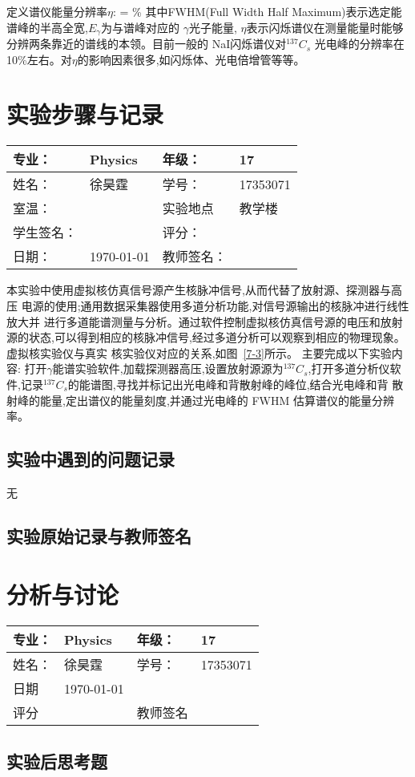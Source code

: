 \documentclass[11pt,a4paper]{ctexart}
\begin{document}
定义谱仪能量分辨率$\eta$:
\beq
\eta = \%
\eeq
其中FWHM(Full Width Half Maximum)表示选定能谱峰的半高全宽,$E_\gamma$为与谱峰对应的
$\gamma$光子能量, $\eta$表示闪烁谱仪在测量能量时能够分辨两条靠近的谱线的本领。目前一般的 NaI闪烁谱仪对$^{137}C_s$ 光电峰的分辨率在 10\%左右。对$\eta$的影响因素很多,如闪烁体、光电倍增管等等。
\newpage
\section{实验步骤与记录}
\begin{tabular}{|p{8em}|p{8em}|p{8em}|p{8em}|}
	\hline 
	专业：     &Physics       &年级：      & 17     \\
	\hline
	姓名：& 徐昊霆 &学号：&17353071  \\
	\hline
	室温：&                    &实验地点 & 教学楼 \\
	\hline	
	学生签名： & & 评分： & \\
	\hline
	日期： & \today & 教师签名：&  \\
	\hline
\end{tabular}

本实验中使用虚拟核仿真信号源产生核脉冲信号,从而代替了放射源、探测器与高压
电源的使用;通用数据采集器使用多道分析功能,对信号源输出的核脉冲进行线性放大并
进行多道能谱测量与分析。通过软件控制虚拟核仿真信号源的电压和放射源的状态,可以得到相应的核脉冲信号,经过多道分析可以观察到相应的物理现象。虚拟核实验仪与真实
核实验仪对应的关系,如图~\ref{7-3}所示。
主要完成以下实验内容:
打开$\gamma$能谱实验软件,加载探测器高压,设置放射源源为$^{137}C_s$,打开多道分析仪软
件,记录$^{137}C_s$的能谱图,寻找并标记出光电峰和背散射峰的峰位,结合光电峰和背
散射峰的能量,定出谱仪的能量刻度,并通过光电峰的 FWHM 估算谱仪的能量分辨
率。

    
\subsection{实验中遇到的问题记录}
无
\subsection{实验原始记录与教师签名}

\newpage
\section{分析与讨论}
\begin{tabular}{|p{7em}|p{7em}|p{7em}|p{7em}|}
	\hline 
	专业：     &Physics       &年级：      & 17     \\
	\hline
	姓名：& 徐昊霆 &学号：&17353071  \\
	\hline
	日期&  \today              & &  \\
	\hline	
	评分 & & 教师签名 & \\
	\hline
\end{tabular}

  
\subsection{实验后思考题}



\end{document}
